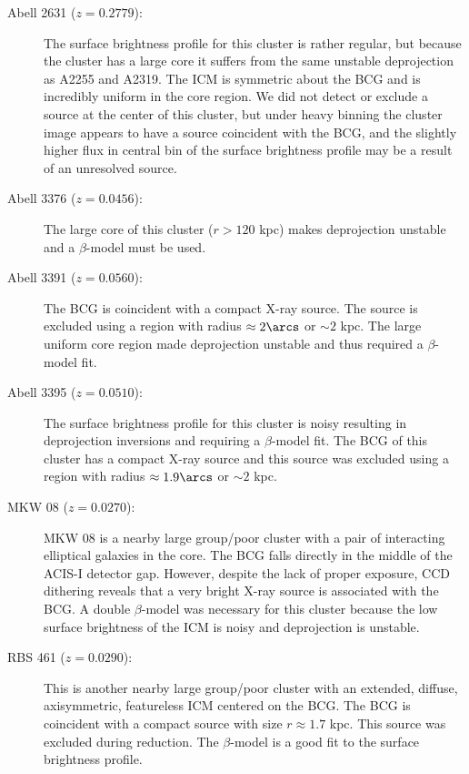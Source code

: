 \begin{description}
\item[Abell 2631 ($z=0.2779$):] The surface brightness profile for
  this cluster is rather regular, but because the cluster has a large
  core it suffers from the same unstable deprojection as A2255 and
  A2319. The ICM is symmetric about the BCG and is incredibly uniform
  in the core region. We did not detect or exclude a source at the
  center of this cluster, but under heavy binning the cluster image
  appears to have a source coincident with the BCG, and the slightly
  higher flux in central bin of the surface brightness profile may be
  a result of an unresolved source.

\item[Abell 3376 ($z=0.0456$):] The large core of this cluster ($r >
  120$ kpc) makes deprojection unstable and a $\beta$-model must be
  used.

\item[Abell 3391 ($z=0.0560$):] The BCG is coincident with a compact
  X-ray source. The source is excluded using a region with radius
  $\approx 2\arcs$ or $\sim 2$ kpc. The large uniform core region
  made deprojection unstable and thus required a $\beta$-model fit.

\item[Abell 3395 ($z=0.0510$):] The surface brightness profile for
  this cluster is noisy resulting in deprojection inversions and
  requiring a $\beta$-model fit. The BCG of this cluster has a compact
  X-ray source and this source was excluded using a region with radius
  $\approx 1.9\arcs$ or $\sim 2$ kpc.

\item[MKW 08 ($z=0.0270$):] MKW 08 is a nearby large group/poor
  cluster with a pair of interacting elliptical galaxies in the
  core. The BCG falls directly in the middle of the ACIS-I detector
  gap. However, despite the lack of proper exposure, CCD dithering
  reveals that a very bright X-ray source is associated with the
  BCG. A double $\beta$-model was necessary for this cluster because
  the low surface brightness of the ICM is noisy and deprojection is
  unstable.

\item[RBS 461 ($z=0.0290$):] This is another nearby large group/poor
  cluster with an extended, diffuse, axisymmetric, featureless ICM
  centered on the BCG. The BCG is coincident with a compact source
  with size $r \approx 1.7$ kpc. This source was excluded during
  reduction. The $\beta$-model is a good fit to the surface brightness
  profile.
\end{description}

